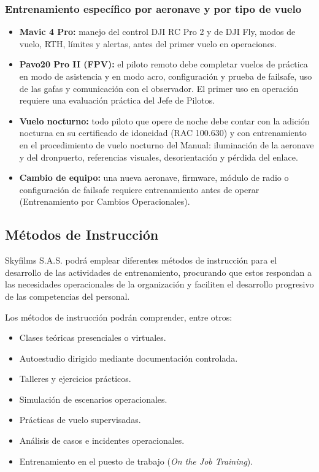 \subsubsection*{Entrenamiento específico por aeronave y por tipo de vuelo}

\begin{itemize}
\item \textbf{Mavic 4 Pro:} manejo del control DJI RC Pro 2 y de DJI Fly, modos de vuelo, RTH, límites y alertas, antes del primer vuelo en operaciones.
\item \textbf{Pavo20 Pro II (FPV):} el piloto remoto debe completar vuelos de práctica en modo de asistencia y en modo acro, configuración y prueba de failsafe, uso de las gafas y comunicación con el observador. El primer uso en operación requiere una evaluación práctica del Jefe de Pilotos.
\item \textbf{Vuelo nocturno:} todo piloto que opere de noche debe contar con la adición nocturna en su certificado de idoneidad (RAC 100.630) y con entrenamiento en el procedimiento de vuelo nocturno del Manual: iluminación de la aeronave y del dronpuerto, referencias visuales, desorientación y pérdida del enlace.
\item \textbf{Cambio de equipo:} una nueva aeronave, firmware, módulo de radio o configuración de failsafe requiere entrenamiento antes de operar (Entrenamiento por Cambios Operacionales).
\end{itemize}

\subsection{Métodos de Instrucción}

Skyfilms S.A.S. podrá emplear diferentes métodos de instrucción para el desarrollo de las actividades de entrenamiento, procurando que estos respondan a las necesidades operacionales de la organización y faciliten el desarrollo progresivo de las competencias del personal.

Los métodos de instrucción podrán comprender, entre otros:

\begin{itemize}
    \item Clases teóricas presenciales o virtuales.
    \item Autoestudio dirigido mediante documentación controlada.
    \item Talleres y ejercicios prácticos.
    \item Simulación de escenarios operacionales.
    \item Prácticas de vuelo supervisadas.
    \item Análisis de casos e incidentes operacionales.
    \item Entrenamiento en el puesto de trabajo (\textit{On the Job Training}).
\end{itemize}

